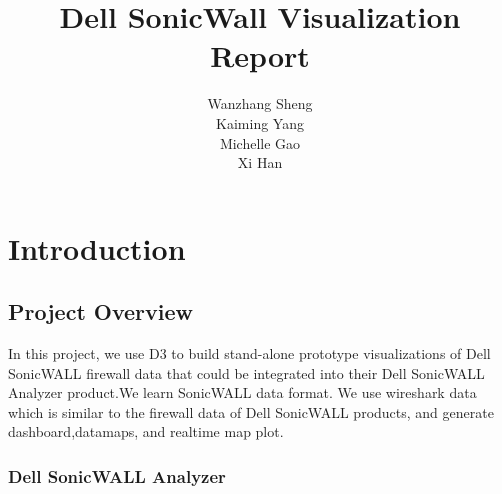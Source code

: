 \documentclass[paper=a4, fontsize=11pt]{report} %
\title{Dell SonicWall Visualization Report}
\author{
Wanzhang Sheng\\
Kaiming Yang\\
Michelle Gao\\
Xi Han
}
\begin{document}
\maketitle


\chapter{Introduction} %
\label{cha:introduction}

\section{Project Overview} %
\label{sec:project_overview}
In this project, we use D3 to build stand-alone prototype visualizations of Dell SonicWALL firewall
data that could be integrated into their Dell SonicWALL Analyzer product.We learn SonicWALL data format. We use wireshark data which is similar to the firewall data of Dell SonicWALL products, and generate dashboard,datamaps, and realtime map plot.

\subsection{Dell SonicWALL Analyzer} %
\label{sub:dell_sonicwall_analyzer}
\end{document}
